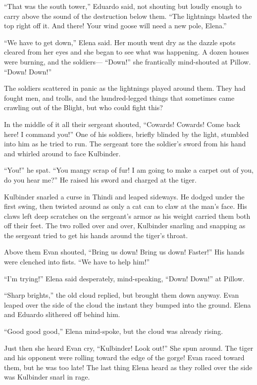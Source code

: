 \documentclass[10pt]{book}
\begin{document}
``That was the south tower,'' Eduardo said, not shouting but loudly enough to carry above the sound of the destruction below them. ``The lightnings blasted the top right off it. And there! Your wind goose will need a new pole, Elena.''

``We have to get down,'' Elena said. Her mouth went dry as the dazzle spots cleared from her eyes and she began to see what was happening. A dozen houses were burning, and the soldiers--- ``Down!'' she frantically mind-shouted at Pillow. ``Down! Down!''

The soldiers scattered in panic as the lightnings played around them. They had fought men, and trolls, and the hundred-legged things that sometimes came crawling out of the Blight, but who could fight this?

In the middle of it all their sergeant shouted, ``Cowards! Cowards! Come back here! I command you!'' One of his soldiers, briefly blinded by the light, stumbled into him as he tried to run. The sergeant tore the soldier's sword from his hand and whirled around to face Kulbinder.

``You!'' he spat. ``You mangy scrap of fur! I am going to make a carpet out of you, do you hear me?'' He raised his sword and charged at the tiger.

Kulbinder snarled a curse in Thindi and leaped sideways. He dodged under the first swing, then twisted around as only a cat can to claw at the man's face.  His claws left deep scratches on the sergeant's armor as his weight carried them both off their feet. The two rolled over and over, Kulbinder snarling and snapping as the sergeant tried to get his hands around the tiger's throat.

Above them Evan shouted, ``Bring us down! Bring us down! Faster!'' His hands were clenched into fists. ``We have to help him!''

``I'm trying!'' Elena said desperately, mind-speaking, ``Down! Down!'' at Pillow.

``Sharp brights,'' the old cloud replied, but brought them down anyway. Evan leaped over the side of the cloud the instant they bumped into the ground. Elena and Eduardo slithered off behind him.

``Good good good,'' Elena mind-spoke, but the cloud was already rising.

Just then she heard Evan cry, ``Kulbinder! Look out!'' She spun around. The tiger and his opponent were rolling toward the edge of the gorge! Evan raced toward them, but he was too late! The last thing Elena heard as they rolled over the side was Kulbinder snarl in rage.
\end{document}
